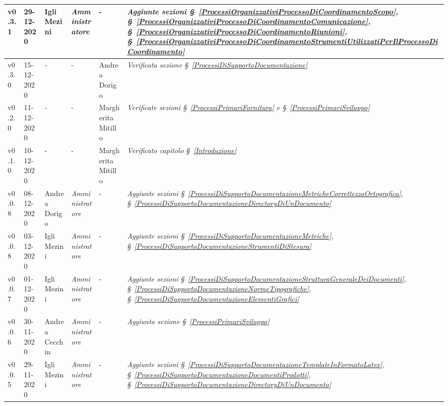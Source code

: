 {\begin{center}
\begin{longtable}[c]{|p{2cm-1\tabcolsep}|p{2cm}|p{3cm-2\tabcolsep}|p{3cm-1.5\tabcolsep}|p{}|p{4cm-2\tabcolsep}|}
		\hline
		\centering v0.3.1 & 29-12-2020 & Igli Mezini & \centering \textit{Amministratore} & \centering - & \textit{Aggiunte sezioni \S~\ref{ProcessiOrganizzativiProcessoDiCoordinamentoScopo}, \S~\ref{ProcessiOrganizzativiProcessoDiCoordinamentoComunicazione}, \S~\ref{ProcessiOrganizzativiProcessoDiCoordinamentoRiunioni}, \S~\ref{ProcessiOrganizzativiProcessoDiCoordinamentoStrumentiUtilizzatiPerIlProcessoDiCoordinamento} } \\
		\hline
		\centering v0.3.0 & 15-12-2020 & \centering - & \centering - & Andrea Dorigo & 
		\textit{Verificata sezione \S~\ref{ProcessiDiSupportoDocumentazione}} \\
		\hline
		\centering v0.2.0 & 11-12-2020 & \centering - & \centering - & Margherita Mitillo & \textit{Verificate sezioni \S~\ref{ProcessiPrimariFornitura} e \S~\ref{ProcessiPrimariSviluppo} } \\
		\hline
		\centering v0.1.0 & 10-12-2020 & \centering - & \centering - & Margherita Mitillo & \textit{Verificato capitolo \S~\ref{Introduzione}} \\
		\hline
		\centering v0.0.8 & 08-12-2020 & Andrea Dorigo & \centering \textit{Amministratore} & \centering - & \textit{Aggiunte sezioni \S~\ref{ProcessiDiSupportoDocumentazioneMetricheCorrettezzaOrtografica}, \S~\ref{ProcessiDiSupportoDocumentazioneDirectoryDiUnDocumento}} \\
		\hline
		\centering v0.0.8 & 03-12-2020 & Igli Mezini & \centering \textit{Amministratore} & \centering - & \textit{Aggiunte sezioni \S~\ref{ProcessiDiSupportoDocumentazioneMetriche}, \S~\ref{ProcessiDiSupportoDocumentazioneStrumentiDiStesura}} \\
		\hline
		\centering v0.0.7 & 01-12-2020 & Igli Mezini & \centering \textit{Amministratore} & \centering - & \textit{Aggiunte sezioni \S~\ref{ProcessiDiSupportoDocumentazioneStrutturaGeneraleDeiDocumenti}, \S~\ref{ProcessiDiSupportoDocumentazioneNormeTipografiche}, \S~\ref{ProcessiDiSupportoDocumentazioneElementiGrafici}} \\
		\hline
		\centering v0.0.6 & 30-11-2020 & Andrea Cecchin & \centering \textit{Amministratore} & \centering - & \textit{Aggiunta sezione \S~\ref{ProcessiPrimariSviluppo}} \\
		\hline
		\centering v0.0.5 & 29-11-2020 & Igli Mezini & \centering \textit{Amministratore} & \centering - & \textit{Aggiunte sezioni \S~\ref{ProcessiDiSupportoDocumentazioneTemplateInFormatoLatex}, \S~\ref{ProcessiDiSupportoDocumentazioneDocumentiProdotti}, \S~\ref{ProcessiDiSupportoDocumentazioneDirectoryDiUnDocumento}} \\

\end{longtable}
\end{center}}

